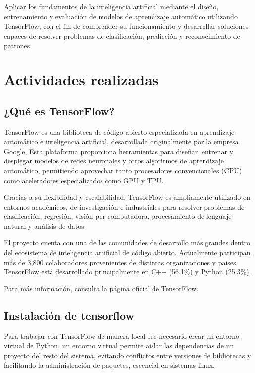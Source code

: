 \documentclass[12pt]{article}
\begin{document}
Aplicar los fundamentos de la inteligencia artificial mediante el diseño, entrenamiento y evaluación de modelos de aprendizaje automático 
utilizando TensorFlow, con el fin de comprender su funcionamiento y desarrollar soluciones capaces de resolver problemas de clasificación,
predicción y reconocimiento de patrones.

\newpage

\section{Actividades realizadas}
\subsection{¿Qué es TensorFlow?}

TensorFlow es una biblioteca de código abierto especializada en aprendizaje automático e inteligencia artificial, desarrollada originalmente por la empresa Google, 
Esta plataforma proporciona herramientas para diseñar, entrenar y desplegar modelos de redes neuronales y otros algoritmos de aprendizaje automático, 
permitiendo aprovechar tanto procesadores convencionales (CPU) como aceleradores especializados como GPU y TPU.

\vspace{0.5cm}

Gracias a su flexibilidad y escalabilidad, TensorFlow es ampliamente utilizado en entornos académicos, de investigación e industriales para resolver problemas de clasificación, 
regresión, visión por computadora, procesamiento de lenguaje natural y análisis de datos

\vspace{0.5cm}

El proyecto cuenta con una de las comunidades de desarrollo más grandes dentro del ecosistema de inteligencia artificial de código abierto. 
Actualmente participan más de 3,800 colaboradores provenientes de distintas organizaciones y países.
TensorFlow está desarrollado principalmente en C++ (56.1\%) y Python (25.3\%).


\vspace{0.5cm}
Para más información, consulta la \href{https://www.tensorflow.org}{página oficial de TensorFlow}.
\newpage
\subsection{Instalación de tensorflow}
Para trabajar con TensorFlow de manera local fue necesario crear un entorno virtual de Python, un entorno virtual permite aislar las dependencias de un proyecto del resto del sistema, evitando conflictos entre versiones de bibliotecas y facilitando la administración de paquetes, escencial en sistemas linux.
\end{document}
